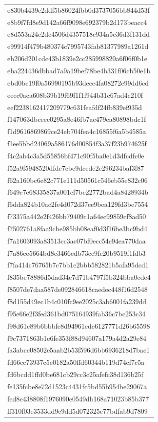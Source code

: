 \begin{tabular}{l}
e830b4439e2ddf5b86024fbb0d3737056bb844d53f \\
e8b9f7fd8e9d142a66f9098e692379b2d173beacc4 \\
e8d553a24c2dc4506d4357518c934a5c36d3f131dd \\
e99914f479b480374c7995743fab81377989a1261d \\
eb206d201cdc43b1839e2cc285998820a6f06f0b1e \\
eba224436dbbad7a9a19bef78be4b331f06cb50e1b \\
ebd0be19f0a56990195b93deee4fa08272c99dd6cd \\
eeec0aca608b39b19f69f1f1f944b31c67ad4c210f \\
eef2238162417209779c631feafdf24fb839ef935d \\
f147063dbceec0295a8e46fb7ae479ea80898bdc1f \\
f1d9616869869ce24eb704fea4c16855f6a5b4585a \\
f1ee5bbd24069a586176d00854f3a37f23b974625f \\
f4c2ab4c3a5d55856bf471c90f5ba0e1d3dfcdfc0e \\
f52a9f5948520dfde7cbc9dcede2e296234baf3f87 \\
f62a160bc6e82c771e111d50561c546eb55e832c06 \\
f649c7e68335837a001cf7bc22772bad4a8428934b \\
f6dda824b10ac2fe4d072d37ee9bea129fd3be7554 \\
f73375a442e2f426bb79409c1a64ec99859cf8ad50 \\
f7502761a8faa9cbe985bb08eaf0d3f16be3bc9bd4 \\
f7a1603093a83513cc3ac07bf0ecc54c94ea770daa \\
f7a86ce5664bd8c3466edb73cc9fc20b9519f1fdb3 \\
f7fa414c76765b7c7bb1e2bbb582821b5afa95dcd1 \\
f835be78886d5dad34c7d71b4797f5b324bba0ede4 \\
f8507de7daa587de092846618caedec448f16d2548 \\
f8d155d49ec1b4c010fc9ee2025c3ab6001fa239dd \\
f95e66e2f3fed361bd075164939fab36c7bc253c34 \\
f98d61c89b6bbbfe8d94961ede6127771d26b65598 \\
f9c7371863b1e6fe353f88d94607a179a4d2a29e84 \\
fa3abce08502e5aab2b53f596d6bb6936218d7bae1 \\
fd66cc73937c5e0182a50ffd60344b119d74cf7c5a \\
fd6bcdd1ffd0be681cb29cc3c25afefc38d136b25f \\
fe135fcbe8e72d1523c4431fc5bd55b954be29067a \\
fed8e438808f1976090e0549db168a71023b85b377 \\
ff310f03e3533dd9c9dd5d072325e77bdfab9d7809 \\
\bottomrule
\end{tabular}
